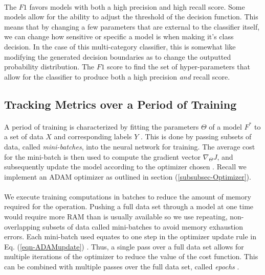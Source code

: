 \documentclass[12pt,letterpaper]{article}
\begin{document}
\paragraph*{}The $F1$ favors models with both a high precision and high recall score. Some models allow for the ability to adjust the threshold of the decision function. This means that by changing a few parameters that are external to the classifier itself, we can change how sensitive or specific a model is when making it's class decision. In the case of this multi-category classifier, this is somewhat like modifying the generated decision boundaries as to change the outputted probability distribution. The $F1$ score to find the set of hyper-parameters that allow for the classifier to produce both a high precision \textit{and} recall score.


\subsection{Tracking Metrics over a Period of Training}
\label{subsec-TrainingMetrics}

\paragraph*{}A period of training is characterized by fitting the parameters $\Theta$ of a model $F^*$ to a set of data $X$ and corresponding labels $Y$ \cite{Goodfellow,Virtanen}. This is done by passing subsets of data, called \textit{mini-batches}, into the neural network for training. The average cost for the mini-batch is then used to compute the gradient vector $\nabla_{\Theta}J$, and subsequently update the model according to the optimizer chosen \cite{Geron,Goodfellow}. Recall we implement an ADAM optimizer as outlined in section (\ref{subsubsec-Optimizer}).

\paragraph{}We execute training computations in batches to reduce the amount of memory required for the operation. Pushing a full data set through a model at one time would require more RAM than is usually available so we use repeating, non-overlapping subsets of data called mini-batches to avoid memory exhaustion errors. Each mini-batch used equates to one step in the optimizer update rule in Eq. (\ref{eqn-ADAMupdate}) \cite{Goodfellow}. Thus, a single pass over a full data set allows for multiple iterations of the optimizer to reduce the value of the cost function. This can be combined with multiple passes over the full data set, called \textit{epochs} \cite{James,Loy}.
\end{document}
